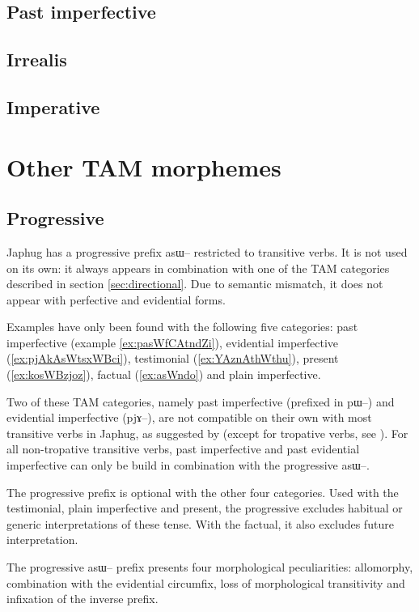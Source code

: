 \documentclass[oldfontcommands,oneside,a4paper,11pt]{article}
\newcommand{\ipa}[1]{{\phon \mbox{#1}}} %
\begin{document}
\subsection{Past imperfective}

\subsection{Irrealis}

\subsection{Imperative}

\section{Other TAM morphemes}
\subsection{Progressive}

Japhug has a progressive prefix \ipa{asɯ--} restricted to transitive verbs. It is not used on its own: it always appears in combination with one of the TAM categories described in section \ref{sec:directional}. Due to semantic mismatch, it does not appear with perfective and evidential forms.


Examples have only been found with the following five categories: past imperfective (example \ref{ex:pasWfCAtndZi}), evidential imperfective (\ref{ex:pjAkAsWtsxWBci}), testimonial (\ref{ex:YAznAthWthu}), present (\ref{ex:kosWBzjoz}), factual (\ref{ex:asWndo}) and plain imperfective. 

Two of these TAM categories, namely past imperfective (prefixed in \ipa{pɯ--}) and evidential imperfective (\ipa{pjɤ--}), are not compatible on their own with most transitive verbs in Japhug, as suggested by \citet{lin11direction} (except for tropative verbs, see \citealt{jacques13tropative}). For all non-tropative transitive verbs, past imperfective and past evidential imperfective can only be build in combination with the progressive \ipa{asɯ--}. 

The progressive prefix is optional with the other four categories. Used with the testimonial, plain imperfective and present, the progressive excludes habitual or generic interpretations of these tense. With the factual, it also excludes future interpretation.


The progressive \ipa{asɯ--} prefix presents four morphological peculiarities: allomorphy, combination with the evidential circumfix, loss of morphological transitivity and infixation of the inverse prefix.
\end{document}
